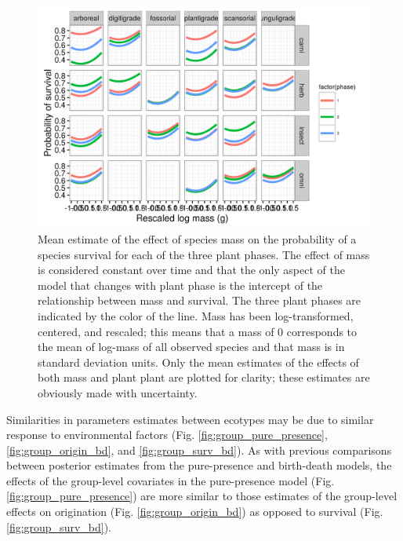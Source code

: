 \documentclass[12pt,letterpaper]{article}
\begin{document}
\begin{figure}[ht]
  \centering
  \includegraphics[width=\textwidth,height=0.5\textheight,keepaspectratio=true]{figure/mass_on_surv_bd}
  \caption[Effect of mass on probability of species survival as estimated from the birth-death model]{Mean estimate of the effect of species mass on the probability of a species survival for each of the three plant phases. The effect of mass is considered constant over time and that the only aspect of the model that changes with plant phase is the intercept of the relationship between mass and survival. The three plant phases are indicated by the color of the line. Mass has been log-transformed, centered, and rescaled; this means that a mass of 0 corresponds to the mean of log-mass of all observed species and that mass is in standard deviation units. Only the mean estimates of the effects of both mass and plant plant are plotted for clarity; these estimates are obviously made with uncertainty.}
  \label{fig:mass_survival}
\end{figure}



Similarities in parameters estimates between ecotypes may be due to similar response to environmental factors (Fig. \ref{fig:group_pure_presence}, \ref{fig:group_origin_bd}, and \ref{fig:group_surv_bd}). As with previous comparisons between posterior estimates from the pure-presence and birth-death models, the effects of the group-level covariates in the pure-presence model (Fig. \ref{fig:group_pure_presence})  are more similar to those estimates of the group-level effects on origination (Fig. \ref{fig:group_origin_bd}) as opposed to survival (Fig. \ref{fig:group_surv_bd}). 
\end{document}
